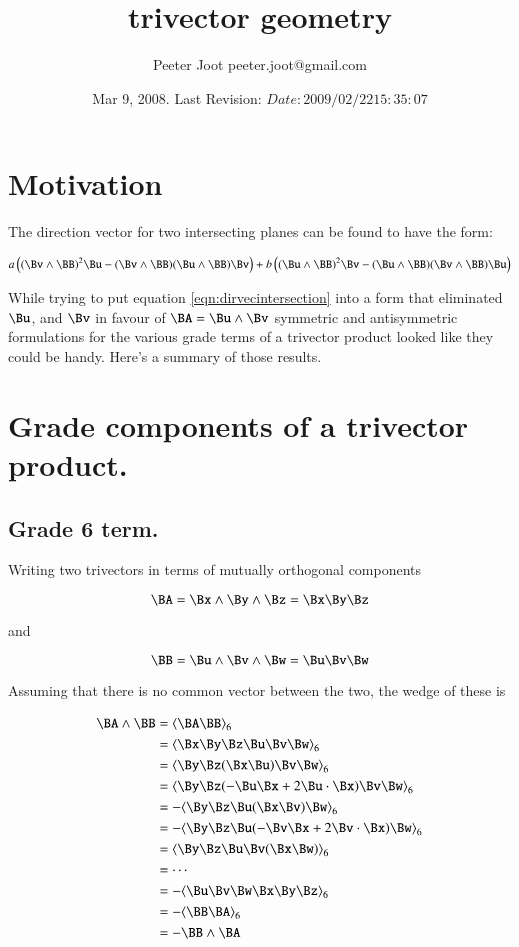 \documentclass{article}      %
\title{trivector geometry} %
\author{Peeter Joot \quad peeter.joot@gmail.com}         %
\date{ Mar 9, 2008.  Last Revision: $Date: 2009/02/22 15:35:07 $ }
\newcommand{\gpgrade}[2] {{\left\langle{{#1}}\right\rangle}_{#2}}
\begin{document}

\maketitle{}

\section{Motivation}

The direction vector for two intersecting planes can be found to have the
form:

\begin{equation}\label{eqn:dirvecintersection}
a\left( (\Bv \wedge \BB)^2 \Bu
- (\Bv \wedge \BB)(\Bu \wedge \BB)\Bv \right)
+ b\left((\Bu \wedge \BB)^2 \Bv 
- (\Bu \wedge \BB)(\Bv \wedge \BB)\Bu\right)
\end{equation}

While trying to put equation \ref{eqn:dirvecintersection} into a form
that eliminated $\Bu$, and $\Bv$ in favour of $\BA = \Bu \wedge \Bv$
symmetric and antisymmetric formulations for the various grade terms
of a trivector product looked like they could be handy.  Here's a summary
of those results.

\section{ Grade components of a trivector product. }

\subsection{ Grade 6 term. }

Writing two trivectors in terms
of mutually orthogonal components

\[
\BA = \Bx \wedge \By \wedge \Bz = \Bx\By\Bz
\]

and

\[
\BB = \Bu \wedge \Bv \wedge \Bw =\Bu\Bv\Bw
\]

Assuming that there is no common vector between the two, the 
wedge of these is

\begin{align*}
\BA \wedge \BB 
&= \gpgrade{\BA\BB}{6} \\
&= \gpgrade{\Bx\By\Bz\Bu\Bv\Bw}{6} \\
&= \gpgrade{\By\Bz(\Bx\Bu)\Bv\Bw}{6} \\
&= \gpgrade{\By\Bz(-\Bu\Bx + 2\Bu \cdot \Bx)\Bv\Bw}{6} \\
&= -\gpgrade{\By\Bz\Bu(\Bx\Bv)\Bw}{6} \\
&= -\gpgrade{\By\Bz\Bu(-\Bv\Bx + 2\Bv \cdot \Bx)\Bw}{6} \\
&= \gpgrade{\By\Bz\Bu\Bv(\Bx\Bw)}{6} \\
&= \cdots \\
&= -\gpgrade{\Bu\Bv\Bw\Bx\By\Bz}{6} \\
&= -\gpgrade{\BB\BA}{6} \\
&= -\BB \wedge \BA
\end{align*}
\end{document}

